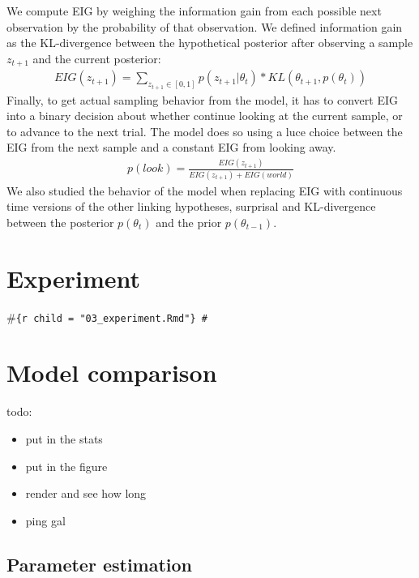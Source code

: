 \documentclass[10pt, letterpaper]{article}
\begin{document}
We compute EIG by weighing the information gain from each possible next
observation by the probability of that observation. We defined
information gain as the KL-divergence between the hypothetical posterior
after observing a sample \(z_{t+1}\) and the current posterior:
\begin{eqnarray}
EIG(z_{t+1}) = \sum_{z_{t+1} \in [0,1]} p(z_{t+1}|\theta_t) * KL(\theta_{t+1}, p(\theta_t))
\end{eqnarray} Finally, to get actual sampling behavior from the model,
it has to convert EIG into a binary decision about whether continue
looking at the current sample, or to advance to the next trial. The
model does so using a luce choice between the EIG from the next sample
and a constant EIG from looking away. \begin{eqnarray}
p(look) = \frac{EIG(z_{t+1})}{EIG(z_{t+1})+EIG(world)}
\end{eqnarray} We also studied the behavior of the model when replacing
EIG with continuous time versions of the other linking hypotheses,
surprisal and KL-divergence between the posterior \(p(\theta_t)\) and
the prior \(p(\theta_{t-1})\).

\hypertarget{experiment}{%
\section{Experiment}\label{experiment}}

\#\texttt{\{r\ child\ =\ "03\_experiment.Rmd"\}\ \#}

\hypertarget{model-comparison}{%
\section{Model comparison}\label{model-comparison}}

todo:

\begin{itemize}
\tightlist
\item
  put in the stats
\item
  put in the figure
\item
  render and see how long
\item
  ping gal
\end{itemize}

\hypertarget{parameter-estimation}{%
\subsection{Parameter estimation}\label{parameter-estimation}}
\end{document}
